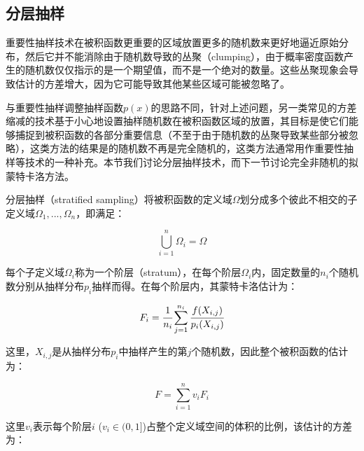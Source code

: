 \subsection{分层抽样}
重要性抽样技术在被积函数更重要的区域放置更多的随机数来更好地逼近原始分布，然后它并不能消除由于随机数导致的丛聚（clumping），由于概率密度函数产生的随机数仅仅指示的是一个期望值，而不是一个绝对的数量。这些丛聚现象会导致估计的方差增大，因为它可能导致其他某些区域可能被忽略了。

与重要性抽样调整抽样函数$p(x)$的思路不同，针对上述问题，另一类常见的方差缩减的技术基于小心地设置抽样随机数在被积函数区域的放置，其目标是使它们能够捕捉到被积函数的各部分重要信息（不至于由于随机数的丛聚导致某些部分被忽略），这类方法的结果是的随机数不再是完全随机的，这类方法通常用作重要性抽样等技术的一种补充。本节我们讨论分层抽样技术，而下一节讨论完全非随机的拟蒙特卡洛方法。

分层抽样（stratified sampling）将被积函数的定义域$\Omega$划分成多个彼此不相交的子定义域$\Omega_1,...,\Omega_n$，即满足：

\begin{equation}
	\bigcup_{i=1}^{n}\Omega_i=\Omega
\end{equation}

\noindent 每个子定义域$\Omega_i$称为一个阶层（stratum），在每个阶层$\Omega_i$内，固定数量的$n_i$个随机数分别从抽样分布$p_i$抽样而得。在每个阶层内，其蒙特卡洛估计为：

\begin{equation}
	F_i= \cfrac{1}{n_i}\sum_{j=1}^{n_i} \cfrac{f(X_{i,j})}{p_i(X_{i,j})}
\end{equation} 

\noindent 这里，$X_{i,j}$是从抽样分布$p_i$中抽样产生的第$j$个随机数，因此整个被积函数的估计为：

\begin{equation}
	F=\sum_{i=1}^{n}v_iF_i
\end{equation}

\noindent 这里$v_i$表示每个阶层$i$ ($v_i\in(0,1]$)占整个定义域空间的体积的比例，该估计的方差为：

